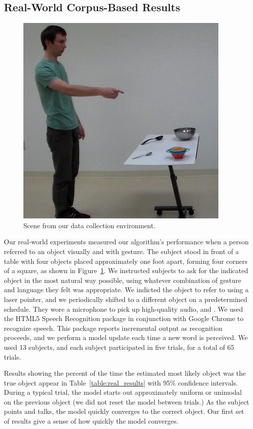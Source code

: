 \documentclass[letterpaper, 10 pt, conference]{ieeeconf}
\begin{document}
\subsection{Real-World Corpus-Based Results}

\begin{figure}
\centering
\includegraphics[width=0.5\linewidth]{figures/dataset.png}
\caption{Scene from our data collection environment.\label{fig:corpus_scene}}
\end{figure}

Our real-world experiments measured our algorithm's performance when a
person referred to an object visually and with gesture.  The subject
stood in front of a table with four objects placed approximately one
foot apart, forming four corners of a square, as shown in
Figure~\ref{fig:corpus_scene}.  We instructed subjects to ask for the
indicated object in the most natural way possible, using whatever
combination of gesture and language they felt was appropriate. We
indicted the object to refer to using a laser pointer, and we
periodically shifted to a different object on a predetermined
schedule.  They wore a microphone to pick up high-quality audio, and
.  We
used the HTML5 Speech Recognition package in conjunction with Google
Chrome to recognize speech.  This package reports incremental output
as recognition proceeds, and we perform a model update each time a new
word is perceived.  We used 13 subjects, and each subject participated
in five trials, for a total of 65 trials.

Results showing the percent of the time the estimated most likely
object was the true object appear in Table~\ref{table:real_results}
with 95\% confidence intervals.  During a typical trial, the model
starts out approximately uniform or unimodal on the previous object
(we did not reset the model between trials.) As the subject points and
talks, the model quickly converges to the correct object.  Our first
set of results give a sense of how quickly the model converges.
\end{document}
